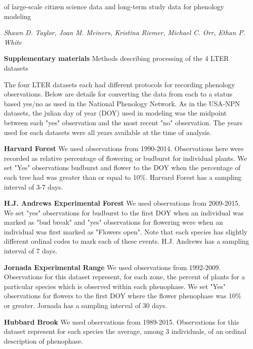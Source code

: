 \documentclass[a4paper,12pt]{article}
\begin{document}
{\Comparison of large-scale citizen science data and long-term study data for phenology modeling \par} \newline

\textit{Shawn D. Taylor, Joan M. Meiners, Kristina Riemer, Michael C. Orr, Ethan P. White} \newline

{\Large \textbf{Supplementary materials}} \newline
Methods describing processing of the 4 LTER datasets

The four LTER datasets each had different protocols for recording phenology observations. Below are details for converting the data from each to a status based yes/no as used in the National Phenology Network. As in the USA-NPN datasets, the julian day of year (DOY) used in modeling was the midpoint between each "yes" observation and the most recent "no" observation. The years used for each datasets were all years available at the time of analysis. 

\textbf{Harvard Forest} \newline
We used observations from 1990-2014. Observations here were recorded as relative percentage of flowering or budburst for individual plants. We set "Yes" observations budburst and flower to the DOY when the percentage of each tree had was greater than or equal to 10\%. Harvard Forest has a sampling interval of 3-7 days.

\textbf{H.J. Andrews Experimental Forest} \newline
We used observations from 2009-2015. We set "yes" observations for budburst to the first DOY when an individual was marked as "bud break" and "yes" observations for flowering were when an individual was first marked as "Flowers open". Note that each species has slightly different ordinal codes to mark each of these events. H.J. Andrews has a sampling interval of 7 days.  

\textbf{Jornada Experimental Range} \newline
We used observations from 1992-2009. Observations for this dataset represent, for each zone, the percent of plants for a particular species which is observed within each phenophase. We set "Yes" observations for flowers to the first DOY where the flower phenophase was 10\% or greater. Jornada has a sampling interval of 30 days. 

\textbf{Hubbard Brook} \newline
We used observations from 1989-2015. Observations for this dataset represent for each species the average, among 3 individuals, of an ordinal description of phenophase. \newline
\end{document}
